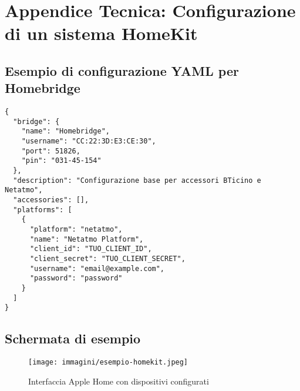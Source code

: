 \chapter{Appendice Tecnica: Configurazione di un sistema HomeKit}
\section*{Esempio di configurazione YAML per Homebridge}
\begin{verbatim}
{
  "bridge": {
    "name": "Homebridge",
    "username": "CC:22:3D:E3:CE:30",
    "port": 51826,
    "pin": "031-45-154"
  },
  "description": "Configurazione base per accessori BTicino e Netatmo",
  "accessories": [],
  "platforms": [
    {
      "platform": "netatmo",
      "name": "Netatmo Platform",
      "client_id": "TUO_CLIENT_ID",
      "client_secret": "TUO_CLIENT_SECRET",
      "username": "email@example.com",
      "password": "password"
    }
  ]
}
\end{verbatim}

\section*{Schermata di esempio}
\begin{figure}[h!]
    \centering
    \texttt{[image: immagini/esempio-homekit.jpeg]}
    \caption{Interfaccia Apple Home con dispositivi configurati}
    \label{fig:homekit-interface}
\end{figure}

